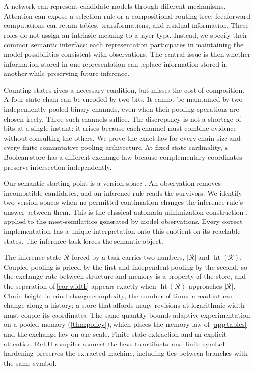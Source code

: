 \documentclass{article}
\theoremstyle{definition}
\newcommand{\R}{\mathcal R}
\newcommand{\height}{\operatorname{ht}}
\begin{document}
A network can represent candidate models through different mechanisms. Attention can expose a selection rule or a compositional routing tree; feedforward computations can retain tables, transformations, and residual information. These roles do not assign an intrinsic meaning to a layer type. Instead, we specify their common semantic interface: each representation participates in maintaining the model possibilities consistent with observations. The central issue is then whether information stored in one representation can replace information stored in another while preserving future inference.

Counting states gives a necessary condition, but misses the cost of composition. A four-state chain can be encoded by two bits. It cannot be maintained by two independently pooled binary channels, even when their pooling operations are chosen freely. Three such channels suffice. The discrepancy is not a shortage of bits at a single instant: it arises because each channel must combine evidence without consulting the others. We prove the exact law for every chain size and every finite commutative pooling architecture. At fixed state cardinality, a Boolean store has a different exchange law because complementary coordinates preserve intersection independently.

Our semantic starting point is a version space \citep{mitchell1982generalization}. An observation removes incompatible candidates, and an inference rule reads the survivors. We identify two version spaces when no permitted continuation changes the inference rule's answer between them. This is the classical automata-minimization construction \citep{moore1956,nerode1958}, applied to the meet-semilattice generated by model observations. Every correct implementation has a unique interpretation onto this quotient on its reachable states. The inference task forces the semantic object.

The inference state $\R$ forced by a task carries two numbers, $|\R|$ and $\height(\R)$. Coupled pooling is priced by the first and independent pooling by the second, so the exchange rate between structure and memory is a property of the store, and the separation of \cref{cor:width} appears exactly when $\height(\R)$ approaches $|\R|$. Chain height is mind-change complexity, the number of times a readout can change along a history; a store that affords many revisions at logarithmic width must couple its coordinates. The same quantity bounds adaptive experimentation on a pooled memory (\cref{thm:policy}), which places the memory law of \cref{app:tables} and the exchange law on one scale. Finite-state extraction and an explicit attention--ReLU compiler connect the laws to artifacts, and finite-symbol hardening preserves the extracted machine, including ties between branches with the same symbol.
\end{document}
